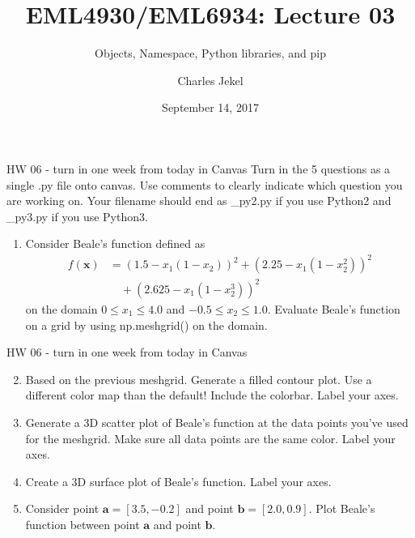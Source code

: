 \documentclass[10pt]{beamer}
\title{EML4930/EML6934: Lecture 03}
\subtitle{Objects, Namespace, Python libraries, and pip}
\date{September 14, 2017}
\author{Charles Jekel}
\begin{document}
\begin{frame}[fragile]{HW 06 - turn in one week from today in Canvas}
Turn in the 5 questions as a single .py file onto canvas. Use comments to clearly indicate which question you are working on. Your filename should end as \_py2.py if you use Python2 and \_py3.py if you use Python3.
\begin{enumerate}
\item Consider Beale's function defined as
\begin{align*}
f(\bm{x}) &= (1.5 - x_1(1-x_2))^2 + (2.25 - x_1(1-x_2^2))^2 \\
 &\quad + (2.625-x_1(1-x_2^3))^2
\end{align*}
on the domain $ 0 \leq x_1 \leq 4.0$ and $-0.5 \leq x_2 \leq 1.0$. Evaluate Beale's function on a grid by using np.meshgrid() on the domain. 
\end{enumerate}
\end{frame}


\begin{frame}[fragile]{HW 06 - turn in one week from today in Canvas}
\begin{enumerate}
\setcounter{enumi}{1}
\item Based on the previous meshgrid. Generate a filled contour plot. Use a different color map than the default! Include the colorbar. Label your axes. 
\item Generate a 3D scatter plot of Beale's function at the data points you've used for the meshgrid. Make sure all data points are the same color. Label your axes.
\item Create a 3D surface plot of Beale's function. Label your axes.
\item Consider point $\bm{a} = [3.5, -0.2]$ and point $\bm{b} = [2.0, 0.9]$. Plot Beale's function between point $\bm{a}$ and point $\bm{b}$.
\end{enumerate}
\end{frame}

%
\end{document}
